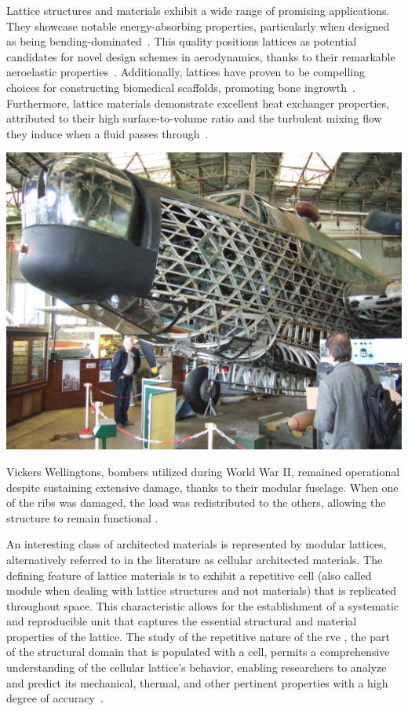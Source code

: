 Lattice structures and materials exhibit a wide range of promising applications. They showcase notable energy-absorbing properties, particularly when designed as being bending-dominated~. This quality positions lattices as potential candidates for novel design schemes in aerodynamics, thanks to their remarkable aeroelastic properties~. Additionally, lattices have proven to be compelling choices for constructing biomedical scaffolds, promoting bone ingrowth~. Furthermore, lattice materials demonstrate excellent heat exchanger properties, attributed to their high surface-to-volume ratio and the turbulent mixing flow they induce when a fluid passes through~.
\begin{marginfigure}
        \includegraphics[width=\linewidth]{figures/02_literature/wellington.jpg}
        \caption{Vickers Wellingtons, bombers utilized during World War II, remained operational despite sustaining extensive damage, thanks to their modular fuselage. When one of the ribs was damaged, the load was redistributed to the others, allowing the structure to remain functional \cite{airshowconsultants_real_2013}.}
        \label{fig:vick}
\end{marginfigure}

An interesting class of architected materials is represented by modular lattices, alternatively referred to in the literature as cellular architected materials. The defining feature of lattice materials is to exhibit a repetitive cell (also called module when dealing with lattice structures and not materials) that is replicated throughout space. This characteristic allows for the establishment of a systematic and reproducible unit that captures the essential structural and material properties of the lattice. The study of the repetitive nature of the \gls{rve} \ie, the part of the structural domain that is populated with a cell, permits a comprehensive understanding of the cellular lattice's behavior, enabling researchers to analyze and predict its mechanical, thermal, and other pertinent properties with a high degree of accuracy~. 


